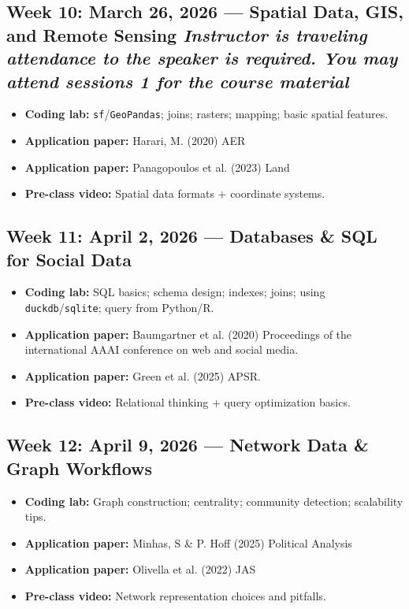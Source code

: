 \documentclass[letterpaper,11pt]{article}
\newcommand{\compresslist}{
\setlength{\itemsep}{1pt}
\setlength{\parskip}{0pt}
\setlength{\parsep}{0pt}
}
\begin{document}
\subsection*{Week 10: March 26, 2026 --- Spatial Data, GIS, and Remote Sensing \textit{Instructor is traveling attendance to the speaker is required. You may attend sessions 1 for the course material}}
\begin{itemize}\compresslist
\item \textbf{Coding lab:} \texttt{sf}/\texttt{GeoPandas}; joins; rasters; mapping; basic spatial features.
\item \textbf{Application paper:} Harari, M. (2020) AER
\item \textbf{Application paper:} Panagopoulos et al. (2023) Land
\item \textbf{Pre-class video:} Spatial data formats + coordinate systems.
\end{itemize}


\subsection*{Week 11: April 2, 2026 --- Databases \& SQL for Social Data}
\begin{itemize}\compresslist
\item \textbf{Coding lab:} SQL basics; schema design; indexes; joins; using \texttt{duckdb}/\texttt{sqlite}; query from Python/R.
\item \textbf{Application paper:} Baumgartner et al. (2020) Proceedings of the international AAAI conference on web and social media.
\item \textbf{Application paper:} Green et al. (2025) APSR.
\item \textbf{Pre-class video:} Relational thinking + query optimization basics.
\end{itemize}

\subsection*{Week 12: April 9, 2026 --- Network Data \& Graph Workflows}
\begin{itemize}\compresslist
\item \textbf{Coding lab:} Graph construction; centrality; community detection; scalability tips.
\item \textbf{Application paper:} Minhas, S \& P. Hoff (2025) Political Analysis
\item \textbf{Application paper:} Olivella et al. (2022) JAS
\item \textbf{Pre-class video:} Network representation choices and pitfalls.
\end{itemize}
\end{document}
